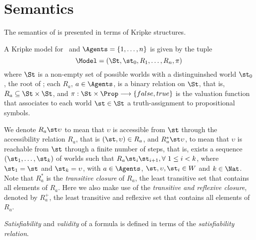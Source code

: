 \section{Semantics}
\label{semantics}

The semantics of  is presented in terms of Kripke structures.

\begin{definition}
    A Kripke model for \Prop~and $\Agents = \{1, \ldots, n\}$ is given by the tuple 
    \begin{equation}
        \Model = (\St, \st_0, R_1, \ldots, R_n, \pi)
    \end{equation}
    where $\St$ is a non-empty set of possible worlds with a distinguinshed world
    $\st_0$, the root of \Model; each $R_a$, $a \in \Agents$, is a binary relation
    on $\St$, that is, $R_a \subseteq \St \times \St$, and $\pi: \St \times \Prop
    \longrightarrow \{false, true\}$ is the valuation function that associates
    to each world $\st \in \St$ a truth-assignment to propositional symbols.
\end{definition}

We denote $R_a \st \upsilon$ to mean that $\upsilon$ is accessible from $\st$ through
the accessibility relation $R_a$, that is $(\st, \upsilon) \in R_a$, and $R^*_a \st
\upsilon$, to mean that $\upsilon$ is reachable from $\st$ through a finite number of
steps, that is, exists a sequence $(\st_1, \ldots, \st_k)$ of worlds such that
$R_a \st_i \st_{i+1}, \forall\ 1 \leq i < k$, where $\st_1 = \st$ and $\st_k =
\upsilon$, with $a \in \Agents$, $\st, \upsilon, \st_i \in W$ and $k \in \Nat$. Note
that $R_a^*$ is the \emph{transitive closure} of $R_a$, the least transitive set
that contains all elements of $R_a$. Here we also make use of the
\emph{transitive and reflexive closure}, denoted by $R_a^+$, the least
transitive and reflexive set that contains all elements of $R_a$.

\emph{Satisfiability} and \emph{validity} of a formula is defined in terms of the \emph{satisfiability relation}.


